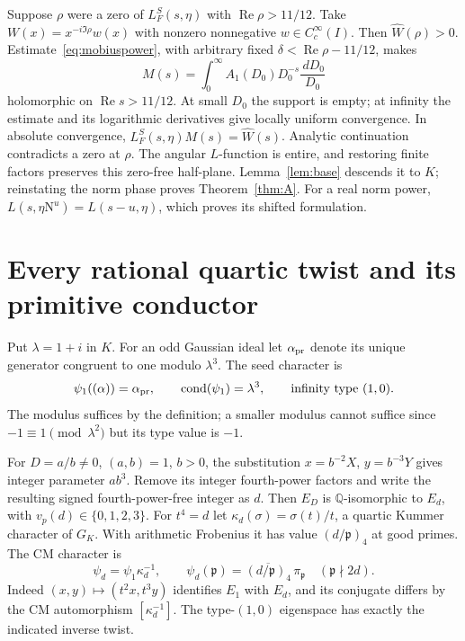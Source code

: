 \documentclass[11pt,a4paper]{article}
\numberwithin{equation}{section}
\theoremstyle{definition}
\theoremstyle{remark}
\newcommand{\Q}{\mathbb Q}
\newcommand{\N}{\mathrm N}
\newcommand{\dd}{\,d}
\newcommand{\Rea}{\operatorname{Re}}
\newcommand{\wt}{\widehat}
\begin{document}
Suppose $\rho$ were a zero of $L_F^S(s,\eta)$ with $\Rea\rho>11/12$. Take $W(x)=x^{-i\Im\rho}w(x)$ with nonzero nonnegative $w\in C_c^\infty(I)$. Then $\wt W(\rho)>0$. Estimate~\eqref{eq:mobiuspower}, with arbitrary fixed $\delta<\Rea\rho-11/12$, makes
\[
 M(s)=\int_0^\infty A_1(D_0)D_0^{-s}\frac{\dd D_0}{D_0}
\]
holomorphic on $\Rea s>11/12$. At small $D_0$ the support is empty; at infinity the estimate and its logarithmic derivatives give locally uniform convergence. In absolute convergence,
$L_F^S(s,\eta)M(s)=\wt W(s)$.
Analytic continuation contradicts a zero at $\rho$. The angular $L$-function is entire, and restoring finite factors preserves this zero-free half-plane. Lemma~\ref{lem:base} descends it to $K$; reinstating the norm phase proves Theorem~\ref{thm:A}. For a real norm power, $L(s,\eta\N^u)=L(s-u,\eta)$, which proves its shifted formulation.

\section{Every rational quartic twist and its primitive conductor}\label{sec:CM}
Put $\lambda=1+i$ in $K$. For an odd Gaussian ideal let $\alpha_{\rm pr}$ denote its unique generator congruent to one modulo $\lambda^3$. The seed character is
\[
 \psi_1((\alpha))=\alpha_{\rm pr},\qquad
 \operatorname{cond}(\psi_1)=\lambda^3,\qquad
 \text{infinity type }(1,0).
\]
The modulus suffices by the definition; a smaller modulus cannot suffice since $-1\equiv1\pmod{\lambda^2}$ but its type value is $-1$.

For $D=a/b\ne0$, $(a,b)=1$, $b>0$, the substitution $x=b^{-2}X$, $y=b^{-3}Y$ gives integer parameter $ab^3$. Remove its integer fourth-power factors and write the resulting signed fourth-power-free integer as $d$. Then $E_D$ is $\Q$-isomorphic to $E_d$, with $v_p(d)\in\{0,1,2,3\}$. For $t^4=d$ let
$\kappa_d(\sigma)=\sigma(t)/t$, a quartic Kummer character of $G_K$. With arithmetic Frobenius it has value $(d/\mathfrak p)_4$ at good primes. The CM character is
\begin{equation}\label{eq:psiD}
 \psi_d=\psi_1\kappa_d^{-1},\qquad
 \psi_d(\mathfrak p)=\overline{(d/\mathfrak p)_4}\,\pi_{\mathfrak p}
                      \quad(\mathfrak p\nmid2d).
\end{equation}
Indeed $(x,y)\mapsto(t^2x,t^3y)$ identifies $E_1$ with $E_d$, and its conjugate differs by the CM automorphism $[\kappa_d^{-1}]$. The type-$(1,0)$ eigenspace has exactly the indicated inverse twist.
\end{document}
